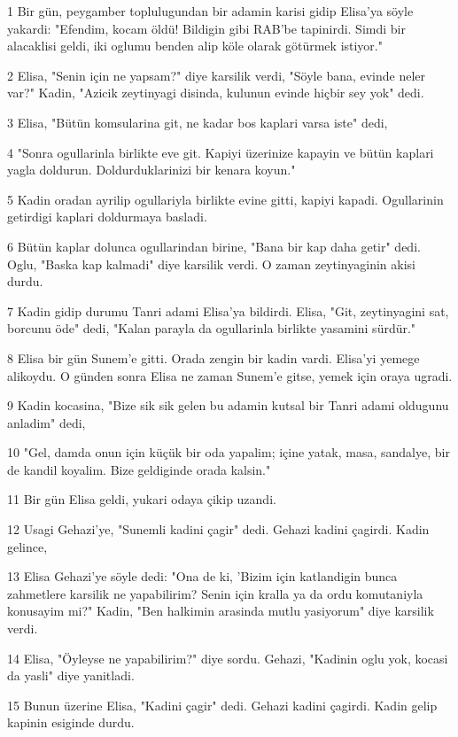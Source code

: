 \par 1 Bir gün, peygamber toplulugundan bir adamin karisi gidip Elisa'ya söyle yakardi: "Efendim, kocam öldü! Bildigin gibi RAB'be tapinirdi. Simdi bir alacaklisi geldi, iki oglumu benden alip köle olarak götürmek istiyor."
\par 2 Elisa, "Senin için ne yapsam?" diye karsilik verdi, "Söyle bana, evinde neler var?" Kadin, "Azicik zeytinyagi disinda, kulunun evinde hiçbir sey yok" dedi.
\par 3 Elisa, "Bütün komsularina git, ne kadar bos kaplari varsa iste" dedi,
\par 4 "Sonra ogullarinla birlikte eve git. Kapiyi üzerinize kapayin ve bütün kaplari yagla doldurun. Doldurduklarinizi bir kenara koyun."
\par 5 Kadin oradan ayrilip ogullariyla birlikte evine gitti, kapiyi kapadi. Ogullarinin getirdigi kaplari doldurmaya basladi.
\par 6 Bütün kaplar dolunca ogullarindan birine, "Bana bir kap daha getir" dedi. Oglu, "Baska kap kalmadi" diye karsilik verdi. O zaman zeytinyaginin akisi durdu.
\par 7 Kadin gidip durumu Tanri adami Elisa'ya bildirdi. Elisa, "Git, zeytinyagini sat, borcunu öde" dedi, "Kalan parayla da ogullarinla birlikte yasamini sürdür."
\par 8 Elisa bir gün Sunem'e gitti. Orada zengin bir kadin vardi. Elisa'yi yemege alikoydu. O günden sonra Elisa ne zaman Sunem'e gitse, yemek için oraya ugradi.
\par 9 Kadin kocasina, "Bize sik sik gelen bu adamin kutsal bir Tanri adami oldugunu anladim" dedi,
\par 10 "Gel, damda onun için küçük bir oda yapalim; içine yatak, masa, sandalye, bir de kandil koyalim. Bize geldiginde orada kalsin."
\par 11 Bir gün Elisa geldi, yukari odaya çikip uzandi.
\par 12 Usagi Gehazi'ye, "Sunemli kadini çagir" dedi. Gehazi kadini çagirdi. Kadin gelince,
\par 13 Elisa Gehazi'ye söyle dedi: "Ona de ki, 'Bizim için katlandigin bunca zahmetlere karsilik ne yapabilirim? Senin için kralla ya da ordu komutaniyla konusayim mi?" Kadin, "Ben halkimin arasinda mutlu yasiyorum" diye karsilik verdi.
\par 14 Elisa, "Öyleyse ne yapabilirim?" diye sordu. Gehazi, "Kadinin oglu yok, kocasi da yasli" diye yanitladi.
\par 15 Bunun üzerine Elisa, "Kadini çagir" dedi. Gehazi kadini çagirdi. Kadin gelip kapinin esiginde durdu.
